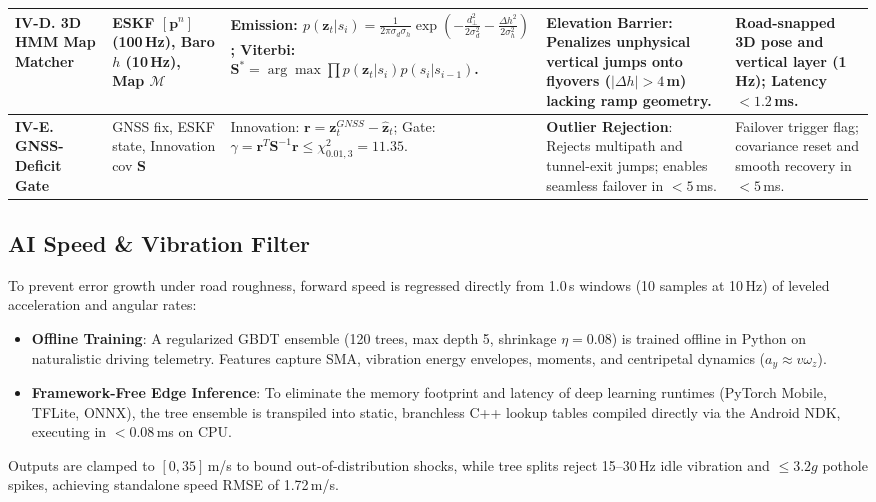 \documentclass[conference]{IEEEtran}
\begin{document}
\begin{table}[t]
{\begin{tabular}{|p{2.5cm}|p{2.0cm}|p{6.6cm}|p{4.2cm}|p{2.8cm}|}
\hline
\textbf{IV-D. 3D HMM Map Matcher} & ESKF $[\mathbf{p}^n]$ (100\,Hz), Baro $h$ (10\,Hz), Map $\mathcal{M}$ & Emission: $p(\mathbf{z}_t|s_i) = \frac{1}{2\pi\sigma_d\sigma_h}\exp\left(-\frac{d_{\perp}^2}{2\sigma_d^2} - \frac{\Delta h^2}{2\sigma_h^2}\right)$ \cite{newson2009}; Viterbi: $\mathbf{S}^* = \arg\max \prod p(\mathbf{z}_t|s_i)p(s_i|s_{i-1})$. & \textbf{Elevation Barrier}: Penalizes unphysical vertical jumps onto flyovers ($|\Delta h| > 4$\,m) lacking ramp geometry. & Road-snapped 3D pose and vertical layer (1\,Hz); Latency $<1.2$\,ms. \\
\hline
\textbf{IV-E. GNSS-Deficit Gate} & GNSS fix, ESKF state, Innovation cov $\mathbf{S}$ & Innovation: $\mathbf{r} = \mathbf{z}_t^{GNSS} - \hat{\mathbf{z}}_t$; Gate: $\gamma = \mathbf{r}^T\mathbf{S}^{-1}\mathbf{r} \leq \chi^2_{0.01, 3} = 11.35$. & \textbf{Outlier Rejection}: Rejects multipath and tunnel-exit jumps; enables seamless failover in $<5$\,ms. & Failover trigger flag; covariance reset and smooth recovery in $<5$\,ms. \\
\hline
\end{tabular}%
}
\end{table}

\subsection{AI Speed \& Vibration Filter}
To prevent error growth under road roughness, forward speed is regressed directly from 1.0\,s windows (10 samples at 10\,Hz) of leveled acceleration and angular rates:
\begin{itemize}
\item \textbf{Offline Training}: A regularized GBDT ensemble \cite{friedman2001} (120 trees, max depth 5, shrinkage $\eta=0.08$) is trained offline in Python on naturalistic driving telemetry. Features capture SMA, vibration energy envelopes, moments, and centripetal dynamics ($a_y \approx v\omega_z$).
\item \textbf{Framework-Free Edge Inference}: To eliminate the memory footprint and latency of deep learning runtimes (PyTorch Mobile, TFLite, ONNX), the tree ensemble is transpiled into static, branchless C++ lookup tables compiled directly via the Android NDK, executing in $<0.08$\,ms on CPU.
\end{itemize}
Outputs are clamped to $[0, 35]$\,m/s to bound out-of-distribution shocks, while tree splits reject 15--30\,Hz idle vibration and $\le 3.2g$ pothole spikes, achieving standalone speed RMSE of 1.72\,m/s.
\end{document}
